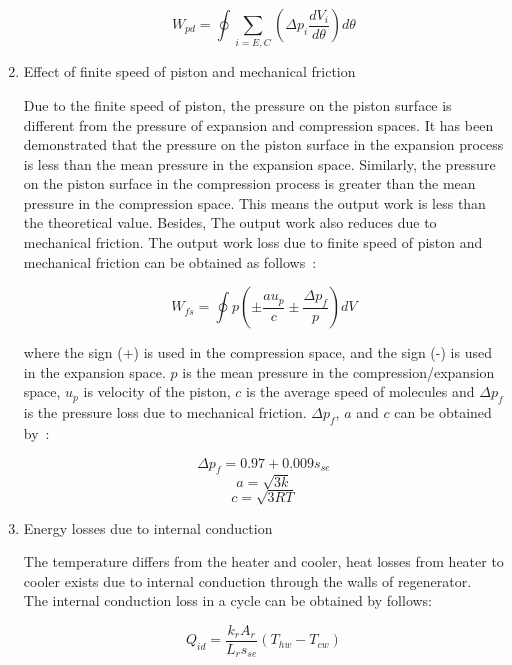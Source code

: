 \begin{enumerate}
\begin{equation}
	W_{pd} = \oint\underset{i = E,C}{\sum}(\Delta p_{i}\frac{dV_i}{d\theta})d\theta
\end{equation}

\item Effect of finite speed of piston and mechanical friction

Due to the finite speed of piston, the pressure on the piston surface is different from the pressure of expansion and compression spaces. It has been demonstrated that the pressure on the piston surface in the expansion process is less than the mean pressure in the expansion space. Similarly, the pressure on the piston surface in the compression process is greater than the mean pressure in the compression space. This means the output work is less than the theoretical value. Besides, The output work also reduces due to mechanical friction. The output work loss due to finite speed of piston and mechanical friction can be obtained as follows~\cite{Babaelahi2015}:

\begin{equation}
	W_{fs} = \oint p(\pm\frac{au_p}{c}\pm\frac{\Delta p_f}{p})dV
\end{equation}

where the sign (+) is used in the compression space, and the sign (-) is used in the expansion space. $p$ is the mean pressure in the compression/expansion space, $u_p$ is velocity of the piston, $c$ is the average speed of molecules and $\Delta p_f$ is the pressure loss due to mechanical friction. $\Delta p_f$, $a$ and $c$ can be obtained by~\cite{Heywood1988}:

\begin{equation}
	\Delta p_f = 0.97+0.009s_{se}
\end{equation}
\begin{equation}
	a = \sqrt{3k}
\end{equation}
\begin{equation}
	c = \sqrt{3RT}
\end{equation}

\item Energy losses due to internal conduction

The temperature differs from the heater and cooler, heat losses from heater to cooler exists due to internal conduction through the walls of regenerator.~\cite{Strauss2010} The internal conduction loss in a cycle can be obtained by follows:

\begin{equation}
	Q_{id} = \frac{k_rA_r}{L_rs_{se}}(T_{hw} - T_{cw})
\end{equation}


\end{enumerate}
